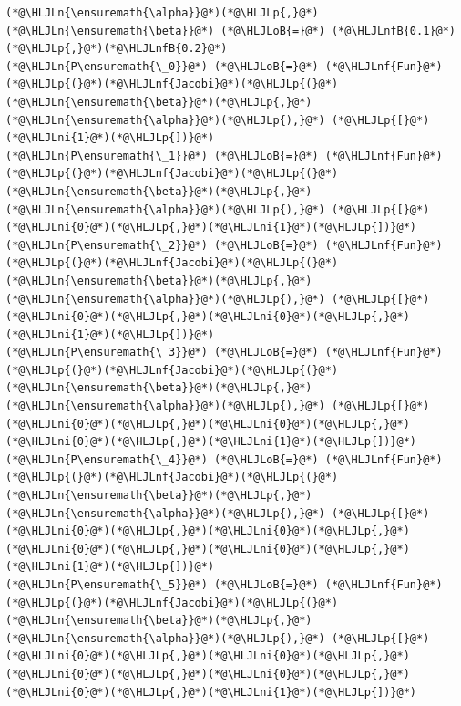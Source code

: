 \documentclass[12pt,a4paper]{article}
\newcommand{\HLJLn}[1]{#1}
\newcommand{\HLJLnf}[1]{\textcolor[RGB]{66,102,213}{#1}}
\newcommand{\HLJLnfB}[1]{\textcolor[RGB]{59,151,46}{#1}}
\newcommand{\HLJLni}[1]{\textcolor[RGB]{59,151,46}{#1}}
\newcommand{\HLJLoB}[1]{\textcolor[RGB]{102,102,102}{\textbf{#1}}}
\newcommand{\HLJLp}[1]{#1}
\begin{document}
\begin{lstlisting}
(*@\HLJLn{\ensuremath{\alpha}}@*)(*@\HLJLp{,}@*)(*@\HLJLn{\ensuremath{\beta}}@*) (*@\HLJLoB{=}@*) (*@\HLJLnfB{0.1}@*)(*@\HLJLp{,}@*)(*@\HLJLnfB{0.2}@*)
(*@\HLJLn{P\ensuremath{\_0}}@*) (*@\HLJLoB{=}@*) (*@\HLJLnf{Fun}@*)(*@\HLJLp{(}@*)(*@\HLJLnf{Jacobi}@*)(*@\HLJLp{(}@*)(*@\HLJLn{\ensuremath{\beta}}@*)(*@\HLJLp{,}@*)(*@\HLJLn{\ensuremath{\alpha}}@*)(*@\HLJLp{),}@*) (*@\HLJLp{[}@*)(*@\HLJLni{1}@*)(*@\HLJLp{])}@*)
(*@\HLJLn{P\ensuremath{\_1}}@*) (*@\HLJLoB{=}@*) (*@\HLJLnf{Fun}@*)(*@\HLJLp{(}@*)(*@\HLJLnf{Jacobi}@*)(*@\HLJLp{(}@*)(*@\HLJLn{\ensuremath{\beta}}@*)(*@\HLJLp{,}@*)(*@\HLJLn{\ensuremath{\alpha}}@*)(*@\HLJLp{),}@*) (*@\HLJLp{[}@*)(*@\HLJLni{0}@*)(*@\HLJLp{,}@*)(*@\HLJLni{1}@*)(*@\HLJLp{])}@*)
(*@\HLJLn{P\ensuremath{\_2}}@*) (*@\HLJLoB{=}@*) (*@\HLJLnf{Fun}@*)(*@\HLJLp{(}@*)(*@\HLJLnf{Jacobi}@*)(*@\HLJLp{(}@*)(*@\HLJLn{\ensuremath{\beta}}@*)(*@\HLJLp{,}@*)(*@\HLJLn{\ensuremath{\alpha}}@*)(*@\HLJLp{),}@*) (*@\HLJLp{[}@*)(*@\HLJLni{0}@*)(*@\HLJLp{,}@*)(*@\HLJLni{0}@*)(*@\HLJLp{,}@*)(*@\HLJLni{1}@*)(*@\HLJLp{])}@*)
(*@\HLJLn{P\ensuremath{\_3}}@*) (*@\HLJLoB{=}@*) (*@\HLJLnf{Fun}@*)(*@\HLJLp{(}@*)(*@\HLJLnf{Jacobi}@*)(*@\HLJLp{(}@*)(*@\HLJLn{\ensuremath{\beta}}@*)(*@\HLJLp{,}@*)(*@\HLJLn{\ensuremath{\alpha}}@*)(*@\HLJLp{),}@*) (*@\HLJLp{[}@*)(*@\HLJLni{0}@*)(*@\HLJLp{,}@*)(*@\HLJLni{0}@*)(*@\HLJLp{,}@*)(*@\HLJLni{0}@*)(*@\HLJLp{,}@*)(*@\HLJLni{1}@*)(*@\HLJLp{])}@*)
(*@\HLJLn{P\ensuremath{\_4}}@*) (*@\HLJLoB{=}@*) (*@\HLJLnf{Fun}@*)(*@\HLJLp{(}@*)(*@\HLJLnf{Jacobi}@*)(*@\HLJLp{(}@*)(*@\HLJLn{\ensuremath{\beta}}@*)(*@\HLJLp{,}@*)(*@\HLJLn{\ensuremath{\alpha}}@*)(*@\HLJLp{),}@*) (*@\HLJLp{[}@*)(*@\HLJLni{0}@*)(*@\HLJLp{,}@*)(*@\HLJLni{0}@*)(*@\HLJLp{,}@*)(*@\HLJLni{0}@*)(*@\HLJLp{,}@*)(*@\HLJLni{0}@*)(*@\HLJLp{,}@*)(*@\HLJLni{1}@*)(*@\HLJLp{])}@*)
(*@\HLJLn{P\ensuremath{\_5}}@*) (*@\HLJLoB{=}@*) (*@\HLJLnf{Fun}@*)(*@\HLJLp{(}@*)(*@\HLJLnf{Jacobi}@*)(*@\HLJLp{(}@*)(*@\HLJLn{\ensuremath{\beta}}@*)(*@\HLJLp{,}@*)(*@\HLJLn{\ensuremath{\alpha}}@*)(*@\HLJLp{),}@*) (*@\HLJLp{[}@*)(*@\HLJLni{0}@*)(*@\HLJLp{,}@*)(*@\HLJLni{0}@*)(*@\HLJLp{,}@*)(*@\HLJLni{0}@*)(*@\HLJLp{,}@*)(*@\HLJLni{0}@*)(*@\HLJLp{,}@*)(*@\HLJLni{0}@*)(*@\HLJLp{,}@*)(*@\HLJLni{1}@*)(*@\HLJLp{])}@*)


\end{lstlisting}
\end{document}
